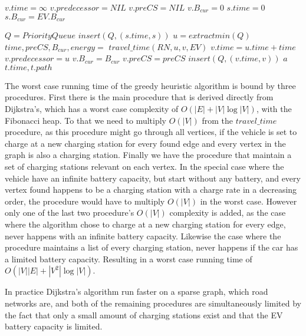 \begin{algorithm}[!htb]
\begin{algorithmic}[1]
        \State $v.time = \infty$
        \State $v.predecessor = NIL$
        \State $v.preCS = NIL$
        \State $v.B_{cur} = 0$
    \EndFor
    \State $s.time = 0$
    \State $s.B_{cur} = EV.B_{cur}$

    \State $Q = PriorityQueue$
    \State $insert(Q, (s.time, s))$ 
        \State $u = extractmin(Q)$
            \State $time,preCS,B_{cur},energy = $
            \State $travel\_time(RN, u, v, EV)$
                \State $v.time = u.time + time$
                \State $v.predecessor = u$
                \State $v.B_{cur} = B_{cur}$
                \State $v.preCS = preCS$
                \State $insert(Q, (v.time, v))$ 
            \EndIf
                \State $a$
            \EndIf
        \EndFor
    \EndWhile
    \State \Return $t.time, t.path$
\EndFunction
\end{algorithmic}\label{alg:fastest_path}
\end{algorithm}


The worst case running time of the greedy heuristic algorithm is bound by three procedures. First there is the main procedure that is derived directly from Dijkstra's, which has a worst case complexity of $O(|E|+|V|\log|V|)$, with the Fibonacci heap. To that we need to multiply $O(|V|)$ from the $travel\_time$ procedure, as this procedure might go through all vertices, if the vehicle is set to charge at a new charging station for every found edge and every vertex in the graph is also a charging station. Finally we have the procedure that maintain a set of charging stations relevant on each vertex. In the special case where the vehicle have an infinite battery capacity, but start without any battery, and every vertex found happens to be a charging station with a charge rate in a decreasing order, the procedure would have to multiply $O(|V|)$ in the worst case.
However only one of the last two procedure's $O(|V|)$ complexity is added, as the case where the algorithm chose to charge at a new charging station for every edge, never happens with an infinite battery capacity. Likewise the case where the procedure maintains a list of every charging station, never happens if the car has a limited battery capacity. Resulting in a worst case running time of $O(|V||E|+|V^2|\log|V|)$. %


In practice Dijkstra's algorithm run faster on a sparse graph, which road networks are, and both of the remaining procedures are simultaneously limited by the fact that only a small amount of charging stations exist and that the EV battery capacity is limited.